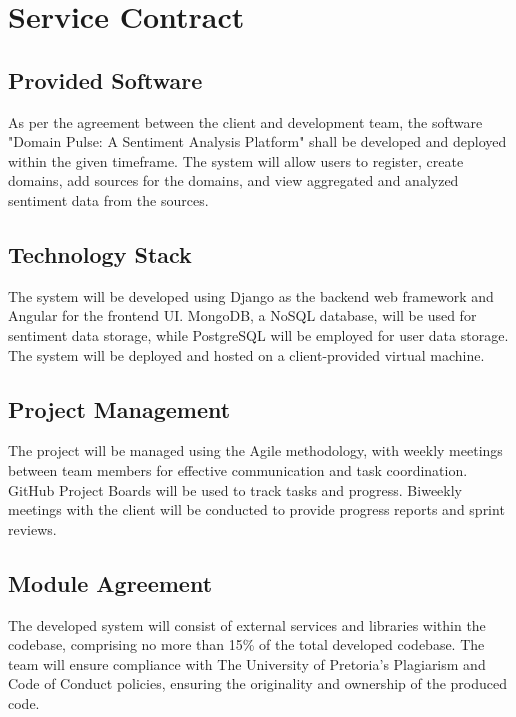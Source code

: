 \documentclass[12pt]{article}
\begin{document}






\newpage

\section{Service Contract}

\subsection{Provided Software}
As per the agreement between the client and development team, the software "Domain Pulse: A Sentiment Analysis Platform" shall be developed and deployed within the given timeframe. The system will allow users to register, create domains, add sources for the domains, and view aggregated and analyzed sentiment data from the sources.

\subsection{Technology Stack}
The system will be developed using Django as the backend web framework and Angular for the frontend UI. MongoDB, a NoSQL database, will be used for sentiment data storage, while PostgreSQL will be employed for user data storage. The system will be deployed and hosted on a client-provided virtual machine.

\subsection{Project Management}
The project will be managed using the Agile methodology, with weekly meetings between team members for effective communication and task coordination. GitHub Project Boards will be used to track tasks and progress. Biweekly meetings with the client will be conducted to provide progress reports and sprint reviews.

\subsection{Module Agreement}
The developed system will consist of external services and libraries within the codebase, comprising no more than 15\% of the total developed codebase. The team will ensure compliance with The University of Pretoria's Plagiarism and Code of Conduct policies, ensuring the originality and ownership of the produced code.
\end{document}
